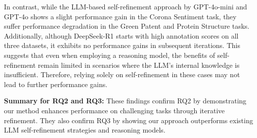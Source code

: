 In contrast, while the LLM-based self-refinement approach by GPT-4o-mini and GPT-4o shows a slight performance gain in the Corona Sentiment task, they suffer performance degradation in the Green Patent and Protein Structure tasks. Additionally, although DeepSeek-R1 starts with high annotation scores on all three datasets, it exhibits no performance gains in subsequent iterations. This suggests that even when employing a reasoning model, the benefits of self-refinement remain limited in scenarios where the LLM's internal knowledge is insufficient. Therefore, relying solely on self-refinement in these cases may not lead to further performance gains.

\textbf{Summary for RQ2 and RQ3:}
These findings confirm RQ2 by demonstrating our method enhances performance on challenging tasks through iterative refinement. They also confirm RQ3 by showing our approach outperforms existing LLM self-refinement strategies and reasoning models.

